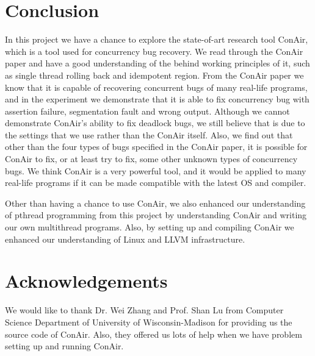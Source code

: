 \section{Conclusion}
In this project we have a chance to explore the state-of-art research tool
ConAir, which is a tool used for concurrency bug recovery. We read through the
ConAir paper and have a good understanding of the behind working principles of
it, such as single thread rolling back and idempotent region. From the
ConAir paper we know that it is capable of recovering concurrent bugs of many
real-life programs, and in the experiment we demonstrate that it is able to fix
concurrency bug with assertion failure, segmentation fault and wrong output.
Although we cannot demonstrate ConAir's ability to fix deadlock bugs, we still
believe that is due to the settings that we use rather than the ConAir itself.
Also, we find out that other than the four types of bugs specified in the ConAir
paper, it is possible for ConAir to fix, or at least try to fix, some other
unknown types of concurrency bugs. We think ConAir is a very powerful tool, and
it would be applied to many real-life programs if it can be made compatible with
the latest OS and compiler.

Other than having a chance to use ConAir, we also enhanced our understanding of
pthread programming from this project by understanding ConAir and writing our
own multithread programs. Also, by setting up and compiling ConAir we enhanced
our understanding of Linux and LLVM infrastructure.

\section{Acknowledgements}
We would like to thank Dr. Wei Zhang and Prof. Shan Lu from Computer Science
Department of University of Wisconsin-Madison for providing us the source code
of ConAir. Also, they offered us lots of help when we have problem setting up and
running ConAir.
